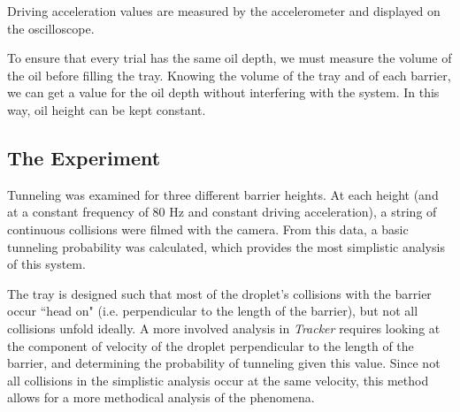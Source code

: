 Driving acceleration values are measured by the accelerometer and displayed on the oscilloscope. 

To ensure that every trial has the same oil depth, we must measure the volume of the oil before filling the tray. Knowing the volume of the tray and of each barrier, we can get a value for the oil depth without interfering with the system. In this way, oil height can be kept constant.

\subsection{The Experiment}

Tunneling was examined for three different barrier heights. At each height (and at a constant frequency of 80 Hz and constant driving acceleration), a string of continuous collisions were filmed with the camera. From this data, a basic tunneling probability was calculated, which provides the most simplistic analysis of this system. 

The tray is designed such that most of the droplet's collisions with the barrier occur ``head on" (i.e. perpendicular to the length of the barrier), but not all collisions unfold ideally. A more involved analysis in \textit{Tracker} requires looking at the component of velocity of the droplet perpendicular to the length of the barrier, and determining the probability of tunneling given this value. Since not all collisions in the simplistic analysis occur at the same velocity, this method allows for a more methodical analysis of the phenomena. 
